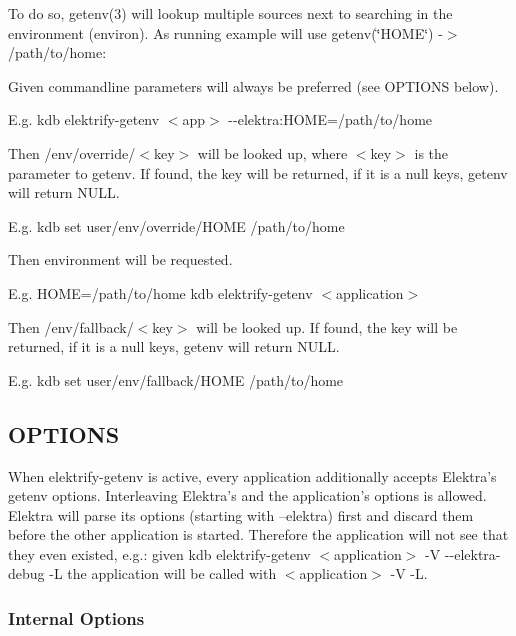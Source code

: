 To do so, getenv(3) will lookup multiple sources next to searching in the environment (environ). As running example will use {\ttfamily getenv(\char`\"{}\+H\+O\+M\+E\char`\"{}) -\/$>$ /path/to/home}\+:


\begin{DoxyEnumerate}
\item Given commandline parameters will always be preferred (see O\+P\+T\+I\+O\+N\+S below).

E.\+g. {\ttfamily kdb elektrify-\/getenv $<$app$>$ -\/-\/elektra\+:H\+O\+M\+E=/path/to/home}
\item Then {\ttfamily /env/override/$<$key$>$} will be looked up, where $<$key$>$ is the parameter to {\ttfamily getenv}. If found, the key will be returned, if it is a null keys, {\ttfamily getenv} will return {\ttfamily N\+U\+L\+L}.

E.\+g. {\ttfamily kdb set user/env/override/\+H\+O\+M\+E /path/to/home}
\item Then environment will be requested.

E.\+g. {\ttfamily H\+O\+M\+E=/path/to/home kdb elektrify-\/getenv $<$application$>$}
\end{DoxyEnumerate}
\begin{DoxyEnumerate}
\item Then {\ttfamily /env/fallback/$<$key$>$} will be looked up. If found, the key will be returned, if it is a null keys, {\ttfamily getenv} will return {\ttfamily N\+U\+L\+L}.

E.\+g. {\ttfamily kdb set user/env/fallback/\+H\+O\+M\+E /path/to/home}
\end{DoxyEnumerate}

\subsection*{O\+P\+T\+I\+O\+N\+S}

When {\ttfamily elektrify-\/getenv} is active, every application additionally accepts Elektra's getenv options. Interleaving Elektra's and the application's options is allowed. Elektra will parse its options (starting with --elektra) first and discard them before the other application is started. Therefore the application will not see that they even existed, e.\+g.\+: given {\ttfamily kdb elektrify-\/getenv $<$application$>$ -\/\+V -\/-\/elektra-\/debug -\/\+L} the application will be called with {\ttfamily $<$application$>$ -\/\+V -\/\+L}.

\subsubsection*{Internal Options}


